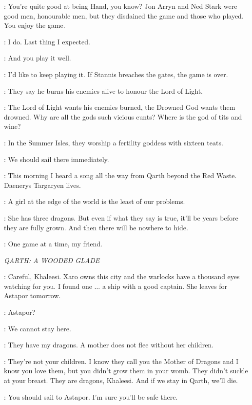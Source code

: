 \VARYS: You're quite good at being Hand, you know? Jon Arryn and Ned Stark were good men, honourable men, but they disdained the game and those who played. You enjoy the game. 

\TYRION: I do. Last thing I expected. 

\VARYS: And you play it well. 

\TYRION: I'd like to keep playing it. If Stannis breaches the gates, the game is over. 

\VARYS: They say he burns his enemies alive to honour the Lord of Light. 

\TYRION: The Lord of Light wants his enemies burned, the Drowned God wants them drowned. Why are all the gods such vicious cunts? Where is the god of tits and wine? 

\VARYS: In the Summer Isles, they worship a fertility goddess with sixteen teats. 

\TYRION: We should sail there immediately. 

\VARYS: This morning I heard a song all the way from Qarth beyond the Red Waste. Daenerys Targaryen lives. 

\TYRION: A girl at the edge of the world is the least of our problems. 

\VARYS: She has three dragons. But even if what they say is true, it'll be years before they are fully grown. And then there will be nowhere to hide. 

\TYRION: One game at a time, my friend. 


\scene

\textit{QARTH: A WOODED GLADE} 


\JORAH: Careful, Khaleesi. Xaro owns this city and the warlocks have a thousand eyes watching for you. I found one $\ldots$ a ship with a good captain. She leaves for Astapor tomorrow. 

\DAENERYS: Astapor? 

\JORAH: We cannot stay here. 

\DAENERYS: They have my dragons. A mother does not flee without her children. 

\JORAH: They're not your children. I know they call you the Mother of Dragons and I know you love them, but you didn't grow them in your womb. They didn't suckle at your breast. They are dragons, Khaleesi. And if we stay in Qarth, we'll die. 

\DAENERYS: You should sail to Astapor. I'm sure you'll be safe there. 

